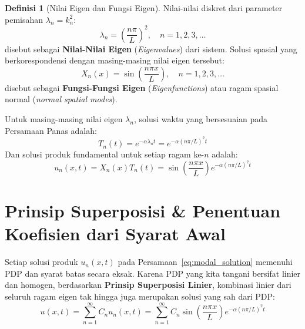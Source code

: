 \documentclass[11pt,a4paper]{article}
\theoremstyle{definition}
\newtheorem{definition}{Definisi}[section]
\begin{document}
\begin{definition}[Nilai Eigen dan Fungsi Eigen]
Nilai-nilai diskret dari parameter pemisahan $\lambda_n = k_n^2$:
\begin{equation}
    \lambda_n = \left( \frac{n \pi}{L} \right)^2, \quad n = 1, 2, 3, \dots
    \label{eq:eigenvalues_dirichlet}
\end{equation}
disebut sebagai \textbf{Nilai-Nilai Eigen} (\textit{Eigenvalues}) dari sistem. Solusi spasial yang berkorespondensi dengan masing-masing nilai eigen tersebut:
\begin{equation}
    X_n(x) = \sin\left(\frac{n \pi x}{L}\right), \quad n = 1, 2, 3, \dots
    \label{eq:eigenfunctions_dirichlet}
\end{equation}
disebut sebagai \textbf{Fungsi-Fungsi Eigen} (\textit{Eigenfunctions}) atau ragam spasial normal (\textit{normal spatial modes}).
\end{definition}

Untuk masing-masing nilai eigen $\lambda_n$, solusi waktu yang bersesuaian pada Persamaan Panas adalah:
\begin{equation}
    T_n(t) = e^{-\alpha \lambda_n t} = e^{-\alpha (n\pi/L)^2 t}
\end{equation}
Dan solusi produk fundamental untuk setiap ragam ke-$n$ adalah:
\begin{equation}
    u_n(x, t) = X_n(x) T_n(t) = \sin\left(\frac{n \pi x}{L}\right) e^{-\alpha (n\pi/L)^2 t}
    \label{eq:modal_solution}
\end{equation}

\section{Prinsip Superposisi \& Penentuan Koefisien dari Syarat Awal}

Setiap solusi produk $u_n(x, t)$ pada Persamaan~\eqref{eq:modal_solution} memenuhi PDP dan syarat batas secara eksak. Karena PDP yang kita tangani bersifat linier dan homogen, berdasarkan \textbf{Prinsip Superposisi Linier}, kombinasi linier dari seluruh ragam eigen tak hingga juga merupakan solusi yang sah dari PDP:
\begin{equation}
    u(x, t) = \sum_{n=1}^{\infty} C_n u_n(x, t) = \sum_{n=1}^{\infty} C_n \sin\left(\frac{n \pi x}{L}\right) e^{-\alpha (n\pi/L)^2 t}
    \label{eq:general_superposition}
\end{equation}
\end{document}
